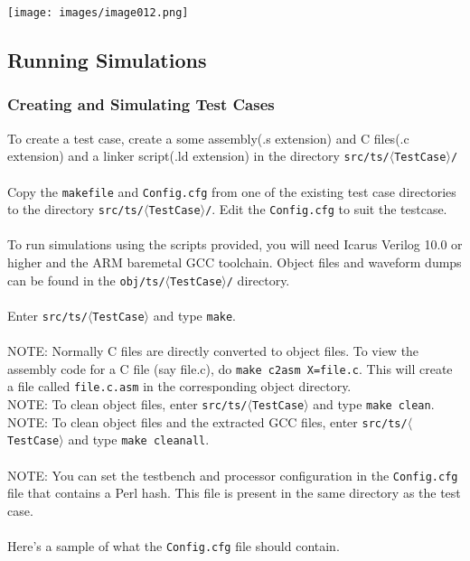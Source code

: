 \documentclass[10pt]{article}
\begin{document}
\texttt{[image: images/image012.png]}

\subsection{Running Simulations}
\subsubsection{Creating and Simulating Test Cases}

To create a test case, create a some assembly(.s extension) and 
C files(.c extension) and a linker script(.ld extension) in the directory 
\texttt{src/ts/$\langle$TestCase$\rangle$/}
\\
\\
Copy the \texttt{makefile} and \texttt{Config.cfg} from one of the existing test case directories 
to the directory \texttt{src/ts/$\langle$TestCase$\rangle$/}. Edit the \texttt{Config.cfg} to suit the testcase.
\\
\\
To run simulations using the scripts provided, you will need Icarus 
Verilog 10.0 or higher and the ARM baremetal GCC toolchain. Object files and 
waveform dumps can be found in the \texttt{obj/ts/$\langle$TestCase$\rangle$/} directory.
\\
\\
Enter \texttt{src/ts/$\langle$TestCase$\rangle$} and type \texttt{make}.
\\
\\
NOTE: Normally C files are directly converted to object files. To view the assembly code for a C file (say file.c), do \texttt{make c2asm X=file.c}.
This will create a file called \texttt{file.c.asm} in the corresponding object directory.
\\
NOTE: To clean object files, enter \texttt{src/ts/$\langle$TestCase$\rangle$} and type \texttt{make clean}.
\\
NOTE: To clean object files and the extracted GCC files, enter \texttt{src/ts/$\langle$TestCase$\rangle$} and type \texttt{make cleanall}.
\\
\\
NOTE: You can set the testbench and processor configuration in the \texttt{Config.cfg} 
file that contains a Perl hash. This file is present in the same directory as 
the test case. 
\\
\\
Here's a sample of what the \texttt{Config.cfg} file should contain.
\\
\end{document}
